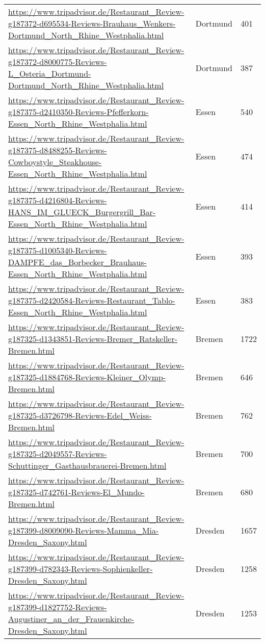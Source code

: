 \begin{table}[]
{\begin{tabular}{lll}
\url{https://www.tripadvisor.de/Restaurant\_Review-g187372-d695534-Reviews-Brauhaus\_Wenkers-Dortmund\_North\_Rhine\_Westphalia.html} & Dortmund & 401 \\ 
\url{https://www.tripadvisor.de/Restaurant\_Review-g187372-d8000775-Reviews-L\_Osteria\_Dortmund-Dortmund\_North\_Rhine\_Westphalia.html} & Dortmund & 387 \\ 
\url{https://www.tripadvisor.de/Restaurant\_Review-g187375-d2410350-Reviews-Pfefferkorn-Essen\_North\_Rhine\_Westphalia.html} & Essen & 540 \\ 
\url{https://www.tripadvisor.de/Restaurant\_Review-g187375-d8488255-Reviews-Cowboystyle\_Steakhouse-Essen\_North\_Rhine\_Westphalia.html} & Essen & 474 \\ 
\url{https://www.tripadvisor.de/Restaurant\_Review-g187375-d4216804-Reviews-HANS\_IM\_GLUECK\_Burgergrill\_Bar-Essen\_North\_Rhine\_Westphalia.html} & Essen & 414 \\ 
\url{https://www.tripadvisor.de/Restaurant\_Review-g187375-d1005340-Reviews-DAMPFE\_das\_Borbecker\_Brauhaus-Essen\_North\_Rhine\_Westphalia.html} & Essen & 393 \\ 
\url{https://www.tripadvisor.de/Restaurant\_Review-g187375-d2420584-Reviews-Restaurant\_Tablo-Essen\_North\_Rhine\_Westphalia.html} & Essen & 383 \\ 
\url{https://www.tripadvisor.de/Restaurant\_Review-g187325-d1343851-Reviews-Bremer\_Ratskeller-Bremen.html} & Bremen & 1722 \\ 
\url{https://www.tripadvisor.de/Restaurant\_Review-g187325-d1884768-Reviews-Kleiner\_Olymp-Bremen.html} & Bremen & 646 \\ 
\url{https://www.tripadvisor.de/Restaurant\_Review-g187325-d3726798-Reviews-Edel\_Weiss-Bremen.html} & Bremen & 762 \\ 
\url{https://www.tripadvisor.de/Restaurant\_Review-g187325-d2049557-Reviews-Schuttinger\_Gasthausbrauerei-Bremen.html} & Bremen & 700 \\ 
\url{https://www.tripadvisor.de/Restaurant\_Review-g187325-d742761-Reviews-El\_Mundo-Bremen.html} & Bremen & 680 \\ 
\url{https://www.tripadvisor.de/Restaurant\_Review-g187399-d8009090-Reviews-Mamma\_Mia-Dresden\_Saxony.html} & Dresden & 1657 \\ 
\url{https://www.tripadvisor.de/Restaurant\_Review-g187399-d782343-Reviews-Sophienkeller-Dresden\_Saxony.html} & Dresden & 1258 \\ 
\url{https://www.tripadvisor.de/Restaurant\_Review-g187399-d1827752-Reviews-Augustiner\_an\_der\_Frauenkirche-Dresden\_Saxony.html} & Dresden & 1253 \\ 

\end{tabular}}
\end{table}
